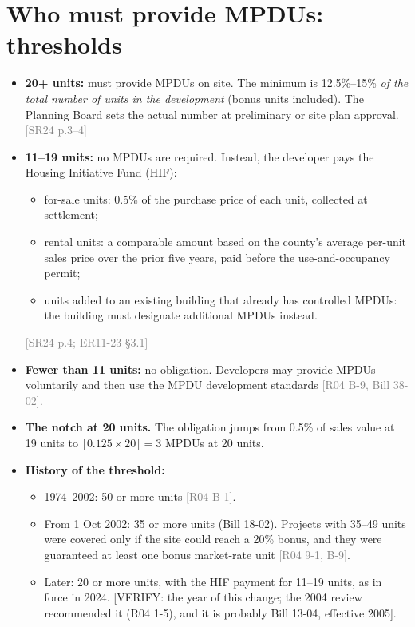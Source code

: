 \documentclass[11pt]{article}
\newcommand{\verify}[1]{\textcolor{red!70!black}{[VERIFY: #1]}}
\newcommand{\src}[1]{\textcolor{gray}{\small[#1]}}
\begin{document}
\section{Who must provide MPDUs: thresholds}
\begin{itemize}
  \item \textbf{20+ units:} must provide MPDUs on site. The minimum is 12.5\%--15\% \emph{of the total number of units in the development} (bonus units included). The Planning Board sets the actual number at preliminary or site plan approval. \src{SR24 p.3--4}
  \item \textbf{11--19 units:} no MPDUs are required. Instead, the developer pays the Housing Initiative Fund (HIF):
    \begin{itemize}
      \item for-sale units: 0.5\% of the purchase price of each unit, collected at settlement;
      \item rental units: a comparable amount based on the county's average per-unit sales price over the prior five years, paid before the use-and-occupancy permit;
      \item units added to an existing building that already has controlled MPDUs: the building must designate additional MPDUs instead.
    \end{itemize}
    \src{SR24 p.4; ER11-23 \S3.1}
  \item \textbf{Fewer than 11 units:} no obligation. Developers may provide MPDUs voluntarily and then use the MPDU development standards \src{R04 B-9, Bill 38-02}.
  \item \textbf{The notch at 20 units.} The obligation jumps from 0.5\% of sales value at 19 units to $\lceil 0.125\times 20\rceil = 3$ MPDUs at 20 units.
  \item \textbf{History of the threshold:}
    \begin{itemize}
      \item 1974--2002: 50 or more units \src{R04 B-1}.
      \item From 1 Oct 2002: 35 or more units (Bill 18-02). Projects with 35--49 units were covered only if the site could reach a 20\% bonus, and they were guaranteed at least one bonus market-rate unit \src{R04 9-1, B-9}.
      \item Later: 20 or more units, with the HIF payment for 11--19 units, as in force in 2024. \verify{the year of this change; the 2004 review recommended it (R04 1-5), and it is probably Bill 13-04, effective 2005}.
    \end{itemize}
\end{itemize}
\end{document}
